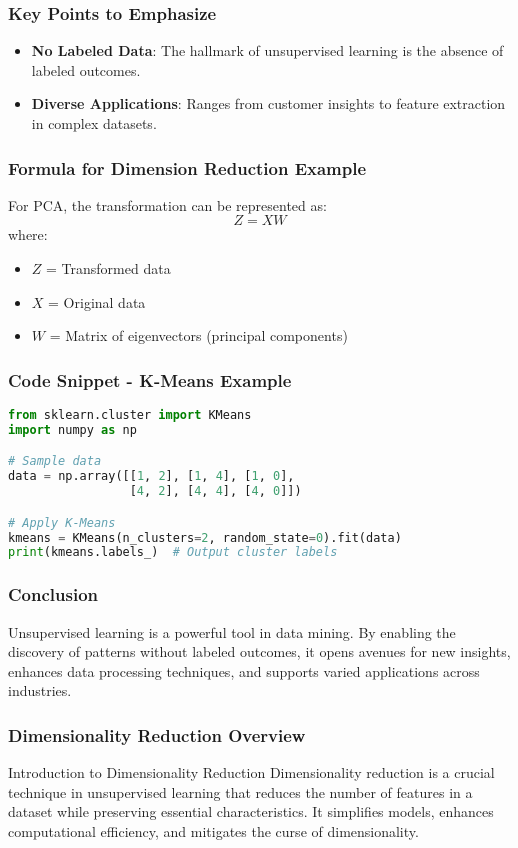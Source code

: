 \documentclass[aspectratio=169]{beamer}
\begin{document}
\begin{frame}[fragile]
  \frametitle{Key Points to Emphasize}
  \begin{itemize}
    \item \textbf{No Labeled Data}: The hallmark of unsupervised learning is the absence of labeled outcomes.
    \item \textbf{Diverse Applications}: Ranges from customer insights to feature extraction in complex datasets.
  \end{itemize}
\end{frame}

\begin{frame}[fragile]
  \frametitle{Formula for Dimension Reduction Example}
  For PCA, the transformation can be represented as:
  \begin{equation}
  Z = XW
  \end{equation}
  where:
  \begin{itemize}
    \item $Z$ = Transformed data
    \item $X$ = Original data
    \item $W$ = Matrix of eigenvectors (principal components)
  \end{itemize}
\end{frame}

\begin{frame}[fragile]
  \frametitle{Code Snippet - K-Means Example}
  \begin{lstlisting}[language=Python]
from sklearn.cluster import KMeans
import numpy as np

# Sample data
data = np.array([[1, 2], [1, 4], [1, 0],
                 [4, 2], [4, 4], [4, 0]])

# Apply K-Means
kmeans = KMeans(n_clusters=2, random_state=0).fit(data)
print(kmeans.labels_)  # Output cluster labels
  \end{lstlisting}
\end{frame}

\begin{frame}[fragile]
  \frametitle{Conclusion}
  Unsupervised learning is a powerful tool in data mining. By enabling the discovery of patterns without labeled outcomes, it opens avenues for new insights, enhances data processing techniques, and supports varied applications across industries.
\end{frame}

\begin{frame}[fragile]
    \frametitle{Dimensionality Reduction Overview}
    \begin{block}{Introduction to Dimensionality Reduction}
        Dimensionality reduction is a crucial technique in unsupervised learning that reduces the number of features in a dataset while preserving essential characteristics. It simplifies models, enhances computational efficiency, and mitigates the curse of dimensionality.
    \end{block}
\end{frame}
\end{document}
